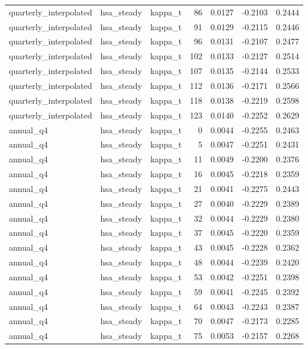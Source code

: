 \begin{tabular}{lllrrrr}
quarterly\_interpolated & hsa\_steady & kappa\_t & 86 & 0.0127 & -0.2103 & 0.2444 \\
quarterly\_interpolated & hsa\_steady & kappa\_t & 91 & 0.0129 & -0.2115 & 0.2446 \\
quarterly\_interpolated & hsa\_steady & kappa\_t & 96 & 0.0131 & -0.2107 & 0.2477 \\
quarterly\_interpolated & hsa\_steady & kappa\_t & 102 & 0.0133 & -0.2127 & 0.2514 \\
quarterly\_interpolated & hsa\_steady & kappa\_t & 107 & 0.0135 & -0.2144 & 0.2533 \\
quarterly\_interpolated & hsa\_steady & kappa\_t & 112 & 0.0136 & -0.2171 & 0.2566 \\
quarterly\_interpolated & hsa\_steady & kappa\_t & 118 & 0.0138 & -0.2219 & 0.2598 \\
quarterly\_interpolated & hsa\_steady & kappa\_t & 123 & 0.0140 & -0.2252 & 0.2629 \\
annual\_q4 & hsa\_steady & kappa\_t & 0 & 0.0044 & -0.2255 & 0.2463 \\
annual\_q4 & hsa\_steady & kappa\_t & 5 & 0.0047 & -0.2251 & 0.2431 \\
annual\_q4 & hsa\_steady & kappa\_t & 11 & 0.0049 & -0.2200 & 0.2376 \\
annual\_q4 & hsa\_steady & kappa\_t & 16 & 0.0045 & -0.2218 & 0.2359 \\
annual\_q4 & hsa\_steady & kappa\_t & 21 & 0.0041 & -0.2275 & 0.2443 \\
annual\_q4 & hsa\_steady & kappa\_t & 27 & 0.0040 & -0.2229 & 0.2389 \\
annual\_q4 & hsa\_steady & kappa\_t & 32 & 0.0044 & -0.2229 & 0.2380 \\
annual\_q4 & hsa\_steady & kappa\_t & 37 & 0.0045 & -0.2220 & 0.2359 \\
annual\_q4 & hsa\_steady & kappa\_t & 43 & 0.0045 & -0.2228 & 0.2362 \\
annual\_q4 & hsa\_steady & kappa\_t & 48 & 0.0044 & -0.2239 & 0.2420 \\
annual\_q4 & hsa\_steady & kappa\_t & 53 & 0.0042 & -0.2251 & 0.2398 \\
annual\_q4 & hsa\_steady & kappa\_t & 59 & 0.0041 & -0.2245 & 0.2392 \\
annual\_q4 & hsa\_steady & kappa\_t & 64 & 0.0043 & -0.2243 & 0.2387 \\
annual\_q4 & hsa\_steady & kappa\_t & 70 & 0.0047 & -0.2173 & 0.2285 \\
annual\_q4 & hsa\_steady & kappa\_t & 75 & 0.0053 & -0.2157 & 0.2268 \\

\end{tabular}
